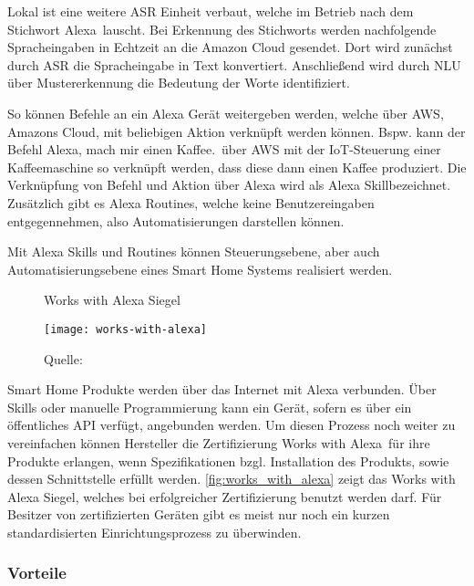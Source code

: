 Lokal ist eine weitere \ac{ASR} Einheit verbaut, welche im Betrieb nach dem Stichwort \glqq Alexa\grqq \ lauscht.
Bei Erkennung des Stichworts werden nachfolgende Spracheingaben in Echtzeit an die Amazon Cloud gesendet.
Dort wird zunächst durch \ac{ASR} die Spracheingabe in Text konvertiert.
Anschließend wird durch \ac{NLU} über Mustererkennung die Bedeutung der Worte identifiziert. 

So können Befehle an ein Alexa Gerät weitergeben werden, welche über \ac{AWS}, Amazons Cloud, mit beliebigen Aktion verknüpft werden können.
Bspw. kann der Befehl \glqq Alexa, mach mir einen Kaffee.\grqq \ über \ac{AWS} mit der \ac{IoT}-Steuerung einer Kaffeemaschine so verknüpft werden, dass diese dann einen Kaffee produziert.
Die Verknüpfung von Befehl und Aktion über Alexa wird als \glqq Alexa Skill\grqq bezeichnet.
Zusätzlich gibt es \glqq Alexa Routines\grqq, welche keine Benutzereingaben entgegennehmen, also Automatisierungen darstellen können.

Mit Alexa Skills und Routines können Steuerungsebene, aber auch Automatisierungsebene eines Smart Home Systems realisiert werden.

\begin{wrapfigure}{r}{0.35\textwidth}
	\centering
	\caption{Works with Alexa Siegel}
	\texttt{[image: works-with-alexa]}
	\caption*{\footnotesize{Quelle: }}
	\label{fig:works_with_alexa}
\end{wrapfigure}

Smart Home Produkte werden über das Internet mit Alexa verbunden.
Über Skills oder manuelle Programmierung kann ein Gerät, sofern es über ein öffentliches \ac{API} verfügt, angebunden werden.
Um diesen Prozess noch weiter zu vereinfachen können Hersteller die Zertifizierung \glqq Works with Alexa\grqq \ für ihre Produkte erlangen, wenn Spezifikationen bzgl. Installation des Produkts, sowie dessen Schnittstelle erfüllt werden.
\autoref{fig:works_with_alexa} zeigt das Works with Alexa Siegel, welches bei erfolgreicher Zertifizierung benutzt werden darf.
Für Besitzer von zertifizierten Geräten gibt es meist nur noch ein kurzen standardisierten Einrichtungsprozess zu überwinden.

\subsubsection{Vorteile}

